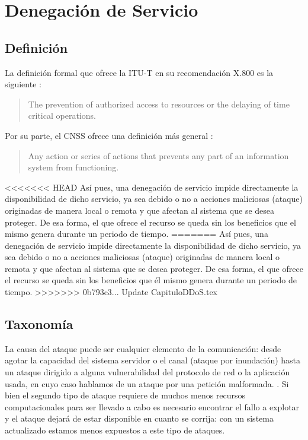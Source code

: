 \section{Denegación de Servicio}\label{sec:Denegacion de Servicio}
\subsection{Definición}\label{ssec:dos definicion}

La definición formal que ofrece la \gls{ITU-T} en su recomendación X.800 es la siguiente \cite{ITU-T_DDoS_def}:

\begin{quote}
 The prevention of authorized access to resources or the delaying of time critical operations.
\end{quote}

Por su parte, el \gls{CNSS} ofrece una definición más general \cite{CCNS_DDoS_def}:

\begin{quote}
 Any action or series of actions that prevents any part of an information system from functioning.
\end{quote}

<<<<<<< HEAD
Así pues, una denegación de servicio impide directamente la disponibilidad de dicho servicio, ya sea debido o no
a acciones maliciosas (ataque) originadas de manera local o remota y que afectan al sistema que se desea
proteger.
De esa forma, el que ofrece el recurso se queda sin los beneficios que el mismo genera durante un periodo de tiempo. %
=======
Así pues, una denegación de servicio impide directamente la disponibilidad de dicho servicio, ya sea debido o no 
a acciones maliciosas (ataque) originadas de manera local o remota y que afectan al sistema que se desea 
proteger. 
De esa forma, el que ofrece el recurso se queda sin los beneficios que él mismo genera durante un periodo de tiempo. %
>>>>>>> 0b793c3... Update CapituloDDoS.tex

\subsection{Taxonomía}\label{ssec:dos taxonomia}

La causa del ataque puede ser cualquier elemento de la comunicación: desde agotar
la capacidad del sistema servidor o el canal (ataque por inundación)
hasta un ataque dirigido a alguna vulnerabilidad del protocolo de red o la aplicación usada,
en cuyo caso hablamos de un ataque por una petición malformada.
\cite{Raghavan}. 
Si bien el segundo tipo  de ataque requiere de muchos menos recursos computacionales para
ser llevado a cabo es necesario encontrar el fallo a explotar y el ataque dejará de estar
disponible en cuanto se corrija: con un sistema actualizado estamos menos expuestos
a este tipo de ataques.

